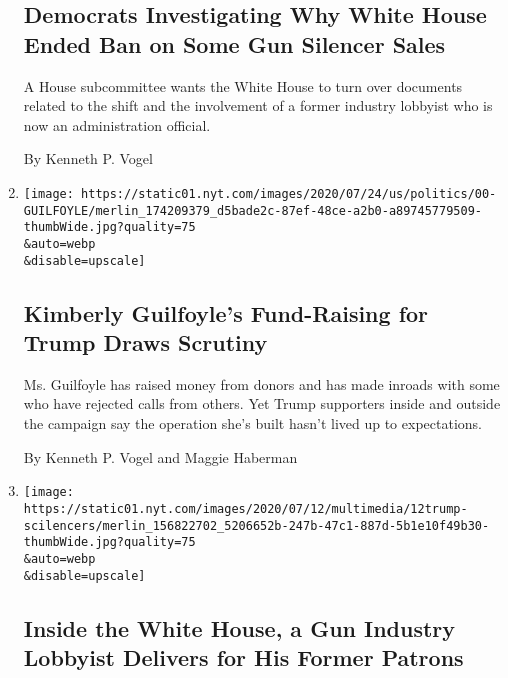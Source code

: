 \begin{enumerate}
{  \subsection{Democrats Investigating Why White House Ended Ban on Some
  Gun Silencer
  Sales}\label{democrats-investigating-why-white-house-ended-ban-on-some-gun-silencer-sales}}

  A House subcommittee wants the White House to turn over documents
  related to the shift and the involvement of a former industry lobbyist
  who is now an administration official.

  By Kenneth P. Vogel
\item
  \href{/2020/07/24/us/politics/kimberly-guilfoyles-trump-fundraising.html}{}

  \texttt{[image: https://static01.nyt.com/images/2020/07/24/us/politics/00-GUILFOYLE/merlin\_174209379\_d5bade2c-87ef-48ce-a2b0-a89745779509-thumbWide.jpg?quality=75\\\&auto=webp\\\&disable=upscale]}

  \hypertarget{kimberly-guilfoyles-fund-raising-for-trump-draws-scrutiny}{%
  \subsection{Kimberly Guilfoyle's Fund-Raising for Trump Draws
  Scrutiny}\label{kimberly-guilfoyles-fund-raising-for-trump-draws-scrutiny}}

  Ms. Guilfoyle has raised money from donors and has made inroads with
  some who have rejected calls from others. Yet Trump supporters inside
  and outside the campaign say the operation she's built hasn't lived up
  to expectations.

  By Kenneth P. Vogel and Maggie Haberman
\item
  \href{/2020/07/13/us/trump-gun-silencer-exports.html}{}

  \texttt{[image: https://static01.nyt.com/images/2020/07/12/multimedia/12trump-scilencers/merlin\_156822702\_5206652b-247b-47c1-887d-5b1e10f49b30-thumbWide.jpg?quality=75\\\&auto=webp\\\&disable=upscale]}

  \hypertarget{inside-the-white-house-a-gun-industry-lobbyist-delivers-for-his-former-patrons}{%
  \subsection{Inside the White House, a Gun Industry Lobbyist Delivers
  for His Former
  Patrons}\label{inside-the-white-house-a-gun-industry-lobbyist-delivers-for-his-former-patrons}}


\end{enumerate}

